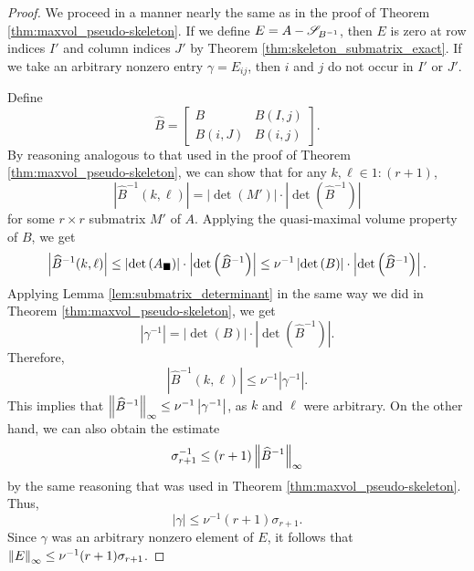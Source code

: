 \documentclass{article}
\begin{document}
	\renewcommand{\biggermat}{\widehat{B}}
	\begin{proof}
		We proceed in a manner nearly the same as in the proof of Theorem \ref{thm:maxvol_pseudo-skeleton}. If we define $E = A - \mathscr{S}_{B^{-1}}$, then $E$ is zero at row indices $I'$ and column indices $J'$ by Theorem \ref{thm:skeleton_submatrix_exact}. If we take an arbitrary nonzero entry $\gamma = E_{ij}$, then $i$ and $j$ do not occur in $I'$ or $J'$.
		
		Define
		\begin{equation}
			\biggermat = \left[\begin{matrix}
				B & B(I, j) \\
				B(i,J) & B(i,j)
			\end{matrix}\right].
		\end{equation}
		By reasoning analogous to that used in the proof of Theorem \ref{thm:maxvol_pseudo-skeleton}, we can show that for any $k, \ell \in 1:(r+1)$,
		\begin{equation}
			\left|\biggermat^{-1}(k,\ell)\right| = |\det(M')|\cdot\left|\det\left(\biggermat^{-1}\right)\right|
		\end{equation}
		for some $r\times r$ submatrix $M'$ of $A$. Applying the quasi-maximal volume property of $B$, we get
		\begin{equation}
			\left|\biggermat^{-1}(k,\ell)\right| \le \left|\det\left(A_\msq\right)\right| \cdot \left|\det\left(\biggermat^{-1}\right)\right| \le \nu^{-1} \left|\det\left(B\right)\right| \cdot \left|\det\left(\biggermat^{-1}\right)\right|.
		\end{equation}
		Applying Lemma \ref{lem:submatrix_determinant} in the same way we did in Theorem \ref{thm:maxvol_pseudo-skeleton}, we get
		\begin{equation}
			\left|\gamma^{-1}\right| = \left|\det\left(B\right)\right| \cdot \left|\det\left(\biggermat^{-1}\right)\right|.
		\end{equation}
		Therefore,
		\begin{equation}
			\left|\biggermat^{-1}(k,\ell)\right| \le \nu^{-1}\left|\gamma^{-1}\right|.
		\end{equation}
		This implies that $\chebnorm{\biggermat^{-1}} \le \nu^{-1}\left|\gamma^{-1}\right|$, as $k$ and $\ell$ were arbitrary.
		On the other hand, we can also obtain the estimate
		\begin{equation}
			\sigma_{r+1}^{-1} \le (r+1)\chebnorm{\biggermat^{-1}}
		\end{equation}
		by the same reasoning that was used in Theorem \ref{thm:maxvol_pseudo-skeleton}. Thus,
		\begin{equation}
			|\gamma| \le \nu^{-1}(r+1)\sigma_{r+1}.
		\end{equation}
		Since $\gamma$ was an arbitrary nonzero element of $E$, it follows that $\left\lVert E \right\rVert_\infty \le \nu^{-1}(r+1)\sigma_{r+1}$.
	\end{proof}
	
\end{document}
